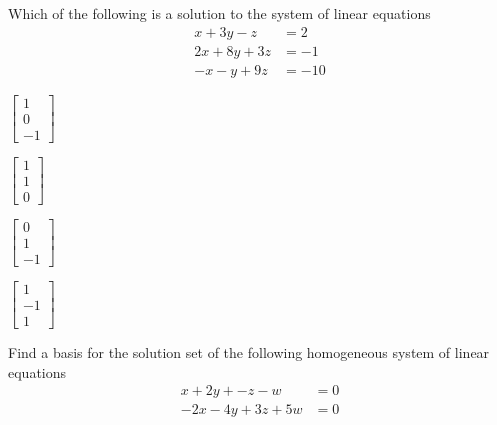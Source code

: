 \setcounter{enumi}{30}
\begin{readinessAssuranceTest}
\item Which of the following is a solution to the system of linear equations
      \begin{align*}
      x+3y-z    &=   2 \\
      2x+8y+3z  &=  -1 \\
      -x-y+9z   &= -10
      \end{align*}

\begin{multicols}{4}
\begin{readinessAssuranceTestChoices}
\item $\begin{bmatrix} 1 \\ 0 \\ -1 \end{bmatrix}$
\item $\begin{bmatrix} 1 \\ 1 \\ 0 \end{bmatrix}$
\item $\begin{bmatrix} 0 \\ 1 \\ -1 \end{bmatrix}$
\item $\begin{bmatrix} 1 \\ -1 \\ 1 \end{bmatrix}$
\end{readinessAssuranceTestChoices}
\end{multicols}


\item Find a basis for the solution set of the following homogeneous system of
      linear equations
      \begin{align*}
      x+2y+-z-w    &= 0 \\
      -2x-4y+3z+5w &= 0
      \end{align*}


\end{readinessAssuranceTest}
